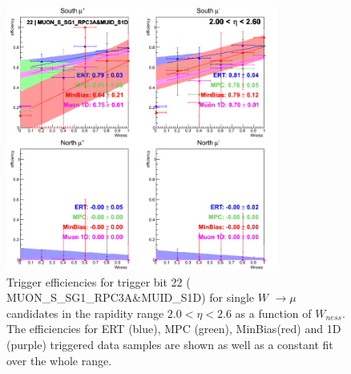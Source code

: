\begin{figure}[h!]

  \centering

  \includegraphics[width=0.8\textwidth]{./figures/run13_trigeffisn_eta2_trig22_lin.png}
  \caption{\label{fig:run13_trigeffisn_eta2_nper0_trig22_lin} Trigger efficiencies for trigger bit 22 ( MUON\_S\_SG1\_RPC3A\&MUID\_S1D) for single $W$ $\rightarrow \mu$ candidates in the rapidity range $ 2.0 < \eta < 2.6$ as a function of $W_{ness}$. The efficiencies for ERT (blue), MPC (green), MinBias(red) and 1D (purple) triggered data samples are shown as well as a constant fit over the whole range.}

\end{figure}
\clearpage
